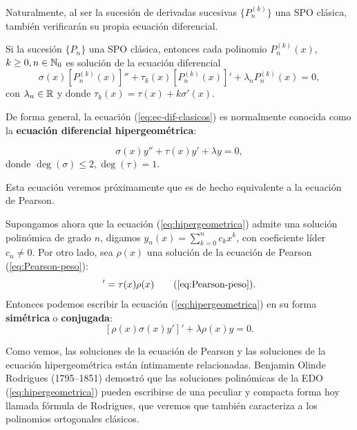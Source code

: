 Naturalmente, al ser la sucesión de derivadas sucesivas $\{P^{(k)}_n\}$ una SPO clásica, también verificarán su propia ecuación diferencial.

\begin{corolario}
    \label{cor:derivadas-k-hipergeometrica}
    Si la sucesión $\{P_n\}$ una SPO clásica, entonces cada polinomio $P^{(k)}_n(x)$, $k\geq 0, n\in\mathbb{N}_0$ es solución de la ecuación diferencial
    \begin{equation}
        \label{eq:ec-dif-der-suc}
        \sigma(x)[P_n^{(k)}(x)]'' + \tau_k(x)[P_n^{(k)}(x)]'+\lambda_n P^{(k)}_n(x) = 0,
    \end{equation}
    con $\lambda_n\in\mathbb{R}$ y donde $\tau_k(x)=\tau(x)+k\sigma'(x)$.
\end{corolario}

De forma general, la ecuación (\ref{eq:ec-dif-clasicos}) es normalmente conocida como la \textbf{ecuación diferencial hipergeométrica}:

\begin{equation}
    \label{eq:hipergeometrica}
    \sigma(x)y'' + \tau(x) y' + \lambda y = 0,
\end{equation}
donde $ \deg(\sigma)\leq 2, \deg(\tau)= 1$.

Esta ecuación veremos próximamente que es de hecho equivalente a la ecuación de Pearson. 

Supongamos ahora que la ecuación (\ref{eq:hipergeometrica}) admite una solución polinómica de grado $n$, digamos $y_n(x) = \sum_{k=0}^n c_k x^k$, con coeficiente líder $c_n\neq 0$. Por otro lado, sea $\rho(x)$ una solución de la ecuación de Pearson (\ref{eq:Pearson-peso}):
\begin{equation*}
    [\sigma(x)\rho(x)]'=\tau(x)\rho(x) \tag{\ref{eq:Pearson-peso}}.
\end{equation*}
Entonces podemos escribir la ecuación (\ref{eq:hipergeometrica}) en su forma \textbf{simétrica} o \textbf{conjugada}:
\begin{equation}
    \label{eq:hipergeometrica-conjugada}
    [\rho(x)\sigma(x)y']' + \lambda \rho(x) y = 0.
\end{equation}

Como vemos, las soluciones de la ecuación de Pearson y las soluciones de la ecuación hipergeométrica están íntimamente relacionadas. Benjamin Olinde Rodrigues (1795--1851) demostró que las soluciones polinómicas de la EDO (\ref{eq:hipergeometrica}) pueden escribirse de una peculiar y compacta forma hoy llamada fórmula de Rodrigues, que veremos que también caracteriza a los polinomios ortogonales clásicos.

